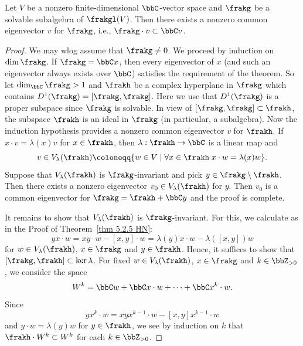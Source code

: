 \begin{thm}[{\cite[Thm.~5.4.7]{HN}}]\label{thm 5.4.7 HN}
    Let $V$ be a nonzero finite-dimensional $\bbC$-vector space and $\frakg$ be a solvable subalgebra of $\frakgl(V)$. Then there exists a nonzero common eigenvector $v$ for $\frakg$, i.e., $\frakg\cdot v\subset \bbC v$.
\end{thm}
\begin{proof}
    We may \gls{wlog} assume that $\frakg\neq 0$. We proceed by induction on $\dim\frakg$. If $\frakg=\bbC x$, then every eigenvector of $x$ (and such an eigenvector always exists over $\bbC$) satisfies the requirement of the theorem. So let $\dim_\bbC\frakg>1$ and $\frakh$ be a complex hyperplane in $\frakg$ which contains $D^1(\frakg)=[\frakg,\frakg]$. Here we use that $D^1(\frakg)$ is a proper subspace since $\frakg$ is solvable. In view of $[\frakg,\frakg]\subset \frakh$, the subspace $\frakh$ is an ideal in $\frakg$ (in particular, a subalgebra). Now the induction hypothesis provides a nonzero common eigenvector $v$ for $\frakh$. If $x\cdot v=\lambda(x)v$ for $x\in\frakh$, then $\lambda:\frakh\to \bbC$ is a linear map and 
    \[v\in V_\lambda(\frakh)\coloneqq \{w\in V\mid \forall x\in\frakh\; x\cdot w=\lambda(x)w\}.\]
    Suppose that $V_\lambda(\frakh)$ is $\frakg$-invariant and pick $y\in\frakg\setminus\frakh$. Then there exists a nonzero eigenvector $v_0\in V_\lambda(\frakh)$ for $y$. Then $v_0$ is a common eigenvector for $\frakg=\frakh+\bbC y$ and the proof is complete.

    It remains to show that $V_\lambda(\frakh)$ is $\frakg$-invariant. For this, we calculate as in the Proof of Theorem~\ref{thm 5.2.5 HN}:
    \[yx\cdot w=xy\cdot w-[x,y]\cdot w=\lambda(y)x\cdot w-\lambda([x,y])w\]
    for $w\in V_\lambda(\frakh)$, $x\in\frakg$ and $y\in\frakh$. Hence, it suffices to show that $[\frakg,\frakh]\subset\ker\lambda$. For fixed $w\in V_\lambda(\frakh)$, $x\in\frakg$ and $k\in\bbZ_{>0}$, we consider the space 
    \[W^k=\bbC w+\bbC x\cdot w+\cdots +\bbC x^k\cdot w.\]
    Since 
    \[yx^k\cdot w=xy x^{k-1}\cdot w-[x,y]x^{k-1}\cdot w\label{eq 5.5 HN}\]
    and $y\cdot w=\lambda(y)w$ for $y\in\frakh$, we see by induction on $k$ that $\frakh\cdot W^k\subset W^k$ for each $k\in \bbZ_{>0}$.


\end{proof}
